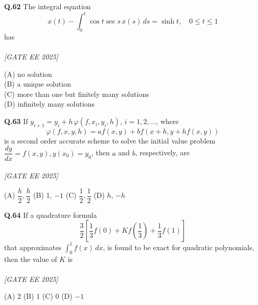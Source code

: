 \documentclass[11pt]{article}
\begin{document}
\begin{flushleft}
\textbf{Q.62} The integral equation 
\[
x(t) - \int_0^t \cos t \sec s \, x(s) \, ds = \sinh t, \quad 0 \leq t \leq 1
\]
has \\
\\[1ex] \textit{[GATE EE 2025]}

(A) no solution \\
(B) a unique solution \\
(C) more than one but finitely many solutions \\
(D) infinitely many solutions
\end{flushleft}

\begin{flushleft}
\textbf{Q.63} If $y_{i+1} = y_i + h \, \varphi(f, x_i, y_i, h)$, $i = 1, 2, \ldots$, where
\[
\varphi(f, x, y, h) = a f(x, y) + b f(x + h, y + h f(x, y))
\]
is a second order accurate scheme to solve the initial value problem $\dfrac{dy}{dx} = f(x, y), y(x_0) = y_0$, then $a$ and $b$, respectively, are \\
\\[1ex] \textit{[GATE EE 2025]}

(A) $\dfrac{h}{2}, \dfrac{h}{2}$ \hspace{2em}
(B) 1, $-1$ \hspace{2em}
(C) $\dfrac{1}{2}, \dfrac{1}{2}$ \hspace{2em}
(D) $h$, $-h$
\end{flushleft}

\begin{flushleft}
\textbf{Q.64} If a quadrature formula
\[
\frac{3}{2} \left[ \frac{1}{3} f(0) + K f\left( \frac{1}{3} \right) + \frac{1}{3} f(1) \right]
\]
that approximates $\int_0^1 f(x) \, dx$, is found to be exact for quadratic polynomials, then the value of $K$ is \\
\\[1ex] \textit{[GATE EE 2025]}

(A) 2 \hspace{2em} (B) 1 \hspace{2em} (C) 0 \hspace{2em} (D) $-1$
\end{flushleft}
\end{document}
